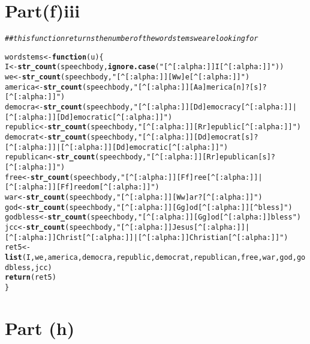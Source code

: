 \documentclass[english]{article}\usepackage[]{graphicx}\usepackage[]{color}
\makeatletter
\newcommand{\hlstr}[1]{\textcolor[rgb]{0.192,0.494,0.8}{#1}}%
\newcommand{\hlcom}[1]{\textcolor[rgb]{0.678,0.584,0.686}{\textit{#1}}}%
\newcommand{\hlstd}[1]{\textcolor[rgb]{0.345,0.345,0.345}{#1}}%
\newcommand{\hlkwa}[1]{\textcolor[rgb]{0.161,0.373,0.58}{\textbf{#1}}}%
\newcommand{\hlkwb}[1]{\textcolor[rgb]{0.69,0.353,0.396}{#1}}%
\newcommand{\hlkwc}[1]{\textcolor[rgb]{0.333,0.667,0.333}{#1}}%
\newcommand{\hlkwd}[1]{\textcolor[rgb]{0.737,0.353,0.396}{\textbf{#1}}}%
\newenvironment{kframe}{%
 \def\at@end@of@kframe{}%
 \ifinner\ifhmode%
  \def\at@end@of@kframe{\end{minipage}}%
  \begin{minipage}{\columnwidth}%
 \fi\fi%
 \def\FrameCommand##1{\hskip\@totalleftmargin \hskip-\fboxsep
 \colorbox{shadecolor}{##1}\hskip-\fboxsep
     \hskip-\linewidth \hskip-\@totalleftmargin \hskip\columnwidth}%
 \MakeFramed {\advance\hsize-\width
   \@totalleftmargin\z@ \linewidth\hsize
   \@setminipage}}%
 {\par\unskip\endMakeFramed%
 \at@end@of@kframe}
\newenvironment{knitrout}{}{} %
\makeatother
\begin{document}
\section*{Part(f)iii}

\begin{knitrout}
\color{fgcolor}\begin{kframe}
\begin{alltt}
\hlcom{## this function returns the number of the word stems we are looking for}

\hlstd{wordstems} \hlkwb{<-} \hlkwa{function}\hlstd{(}\hlkwc{u}\hlstd{)\{}
        \hlstd{I} \hlkwb{<-} \hlkwd{str_count}\hlstd{(speechbody,}\hlkwd{ignore.case}\hlstd{(}\hlstr{"[^[:alpha:]]I[^[:alpha:]]"}\hlstd{))}
        \hlstd{we} \hlkwb{<-} \hlkwd{str_count}\hlstd{(speechbody,}\hlstr{"[^[:alpha:]][Ww]e[^[:alpha:]]"}\hlstd{)}
        \hlstd{america} \hlkwb{<-} \hlkwd{str_count}\hlstd{(speechbody,}\hlstr{"[^[:alpha:]][Aa]merica[n]?[s]?[^[:alpha:]]"}\hlstd{)}
        \hlstd{democra} \hlkwb{<-} \hlkwd{str_count}\hlstd{(speechbody,}\hlstr{"[^[:alpha:]][Dd]emocracy[^[:alpha:]]|[^[:alpha:]][Dd]emocratic[^[:alpha:]]"}\hlstd{)}
        \hlstd{republic} \hlkwb{<-} \hlkwd{str_count}\hlstd{(speechbody,}\hlstr{"[^[:alpha:]][Rr]epublic[^[:alpha:]]"}\hlstd{)}
        \hlstd{democrat} \hlkwb{<-} \hlkwd{str_count}\hlstd{(speechbody,}\hlstr{"[^[:alpha:]][Dd]emocrat[s]?[^[:alpha:]]|[^[:alpha:]][Dd]emocratic[^[:alpha:]]"}\hlstd{)}
        \hlstd{republican} \hlkwb{<-} \hlkwd{str_count}\hlstd{(speechbody,}\hlstr{"[^[:alpha:]][Rr]epublican[s]?[^[:alpha:]]"}\hlstd{)}
        \hlstd{free} \hlkwb{<-} \hlkwd{str_count}\hlstd{(speechbody,}\hlstr{"[^[:alpha:]][Ff]ree[^[:alpha:]]|[^[:alpha:]][Ff]reedom[^[:alpha:]]"}\hlstd{)}
        \hlstd{war} \hlkwb{<-} \hlkwd{str_count}\hlstd{(speechbody,}\hlstr{"[^[:alpha:]][Ww]ar?[^[:alpha:]]"}\hlstd{)}
        \hlstd{god} \hlkwb{<-} \hlkwd{str_count}\hlstd{(speechbody,}\hlstr{"[^[:alpha:]][Gg]od[^[:alpha:]][^bless]"}\hlstd{)}
        \hlstd{godbless} \hlkwb{<-} \hlkwd{str_count}\hlstd{(speechbody,}\hlstr{"[^[:alpha:]][Gg]od[^[:alpha:]]bless"}\hlstd{)}
        \hlstd{jcc} \hlkwb{<-} \hlkwd{str_count}\hlstd{(speechbody,}\hlstr{"[^[:alpha:]]Jesus[^[:alpha:]]|[^[:alpha:]]Christ[^[:alpha:]]|[^[:alpha:]]Christian[^[:alpha:]]"}\hlstd{)}
        \hlstd{ret5} \hlkwb{<-} \hlkwd{list}\hlstd{(I, we, america, democra, republic, democrat, republican, free, war, god, godbless, jcc)}
        \hlkwd{return}\hlstd{(ret5)}
\hlstd{\}}
\end{alltt}
\end{kframe}
\end{knitrout}


\section*{Part (h)}
\end{document}
